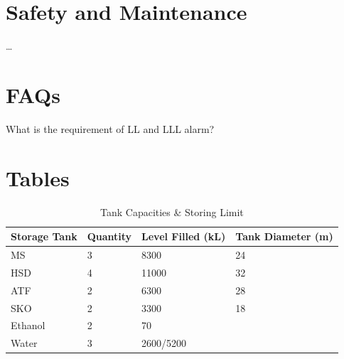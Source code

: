 \documentclass{report}
\begin{document}
	\section{Safety and Maintenance}
	\ldots
	\section{FAQs}
	\begin{description}
		\item[What is the requirement of LL and LLL alarm?] 
	\end{description}
	\clearpage
	\pagebreak
	\section{Tables}
	\begin{table}[h]
		\centering
		\begin{tabular}{@{}llll@{}}
			\toprule
			\textbf{Storage Tank} & \textbf{Quantity} & \textbf{Level Filled (kL)} & \textbf{Tank Diameter (m)} \\ \midrule
			MS                    & 3                 & 8300                       & 24                         \\
			HSD                   & 4                 & 11000                      & 32                         \\
			ATF                   & 2                 & 6300                       & 28                         \\
			SKO                   & 2                 & 3300                       & 18                         \\
			Ethanol               & 2                 & 70                         &                            \\
			Water                 & 3                 & 2600/5200                  &                            \\ \bottomrule
		\end{tabular}
	\caption{Tank Capacities \& Storing Limit}
	\label{bareja_tank_cap}
	\end{table}
	\clearpage
	\pagebreak
\end{document}

